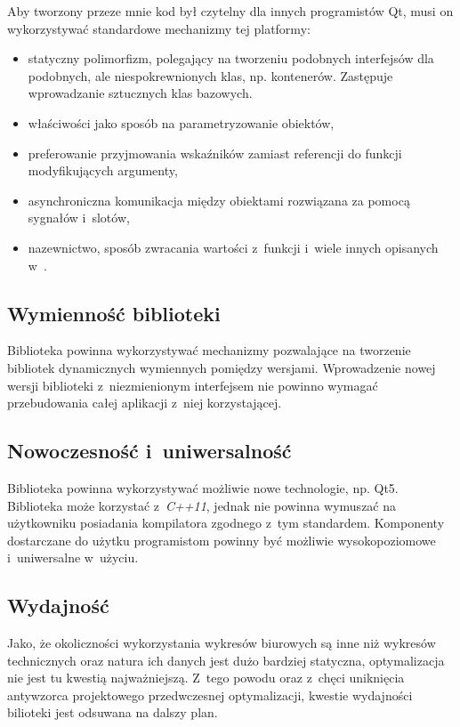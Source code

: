 
Aby tworzony przeze mnie kod był czytelny dla innych programistów Qt, musi on wykorzystywać standardowe mechanizmy tej platformy:
\begin{itemize}
\item{statyczny polimorfizm, polegający na tworzeniu podobnych interfejsów dla podobnych, ale niespokrewnionych klas, np. kontenerów. Zastępuje wprowadzanie sztucznych klas bazowych.}
\item{właściwości jako sposób na parametryzowanie obiektów,}
\item{preferowanie przyjmowania wskaźników zamiast referencji do funkcji modyfikujących argumenty,}
\item{asynchroniczna komunikacja między obiektami rozwiązana za pomocą sygnałów i~slotów,}
\item{nazewnictwo, sposób zwracania wartości z~funkcji i~wiele innych opisanych w~\cite{APIDesign}.}
\end{itemize}

\subsection{Wymienność biblioteki}
Biblioteka powinna wykorzystywać mechanizmy pozwalające na tworzenie bibliotek dynamicznych wymiennych pomiędzy wersjami. Wprowadzenie nowej wersji biblioteki z~niezmienionym interfejsem nie powinno wymagać przebudowania całej aplikacji z~niej korzystającej.

\subsection{Nowoczesność i~uniwersalność}
Biblioteka powinna wykorzystywać możliwie nowe technologie, np. Qt5. Biblioteka może korzystać z~\textit{C++11}, jednak nie powinna wymuszać na użytkowniku posiadania kompilatora zgodnego z~tym standardem. Komponenty dostarczane do użytku programistom powinny być możliwie wysokopoziomowe i~uniwersalne w~użyciu.

\subsection{Wydajność}
Jako, że okoliczności wykorzystania wykresów biurowych są inne niż wykresów technicznych oraz natura ich danych jest dużo bardziej statyczna, optymalizacja nie jest tu kwestią najważniejszą. 
Z~tego powodu oraz z~chęci uniknięcia antywzorca projektowego przedwczesnej optymalizacji, kwestie wydajności bilioteki jest odsuwana na dalszy plan.

